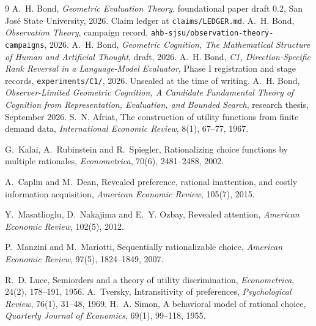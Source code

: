 \documentclass[11pt,letterpaper]{article}
\theoremstyle{plain}
\theoremstyle{definition}
\begin{document}
\begin{thebibliography}{9}
\footnotesize
{} A.~H. Bond, \emph{Geometric Evaluation Theory}, foundational paper
draft 0.2, San Jos\'e State University, 2026. Claim ledger at
\texttt{claims/LEDGER.md}. %
 A.~H. Bond, \emph{Observation Theory}, campaign record,
\texttt{ahb-sjsu/observation-theory-campaigns}, 2026.
 A.~H. Bond, \emph{Geometric Cognition, The Mathematical Structure
of Human and Artificial Thought}, draft, 2026.
 A.~H. Bond, \emph{C1, Direction-Specific Rank Reversal in a
Language-Model Evaluator}, Phase I registration and stage records,
\texttt{experiments/C1/}, 2026. Unsealed at the time of writing.
 A.~H. Bond, \emph{Observer-Limited Geometric Cognition, A
Candidate Fundamental Theory of Cognition from Representation, Evaluation, and
Bounded Search}, research thesis, September 2026.
 S.~N. Afriat, The construction of utility functions from
finite demand data, \emph{International Economic Review}, 8(1), 67--77, 1967.

 G.~Kalai, A.~Rubinstein and R.~Spiegler, Rationalizing choice
functions by multiple rationales, \emph{Econometrica}, 70(6), 2481--2488, 2002.

 A.~Caplin and M.~Dean, Revealed preference, rational
inattention, and costly information acquisition, \emph{American Economic
Review}, 105(7), 2015.

 Y.~Masatlioglu, D.~Nakajima and E.~Y. Ozbay, Revealed
attention, \emph{American Economic Review}, 102(5), 2012.

 P.~Manzini and M.~Mariotti, Sequentially rationalizable
choice, \emph{American Economic Review}, 97(5), 1824--1849, 2007.

 R.~D. Luce, Semiorders and a theory of utility discrimination,
\emph{Econometrica}, 24(2), 178--191, 1956.
 A.~Tversky, Intransitivity of preferences,
\emph{Psychological Review}, 76(1), 31--48, 1969.
 H.~A. Simon, A behavioral model of rational choice,
\emph{Quarterly Journal of Economics}, 69(1), 99--118, 1955.
\end{thebibliography}
\end{document}
